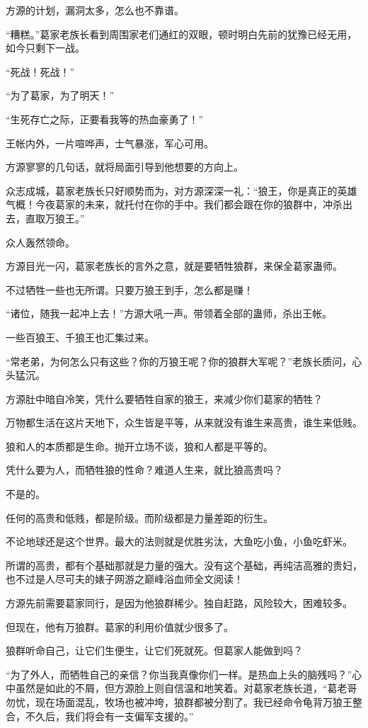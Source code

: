 \begin{this_body}
方源的计划，漏洞太多，怎么也不靠谱。

“糟糕。”葛家老族长看到周围家老们通红的双眼，顿时明白先前的犹豫已经无用，如今只剩下一战。

“死战！死战！”

“为了葛家，为了明天！”

“生死存亡之际，正要看我等的热血豪勇了！”

王帐内外，一片喧哗声，士气暴涨，军心可用。

方源寥寥的几句话，就将局面引导到他想要的方向上。

众志成城，葛家老族长只好顺势而为，对方源深深一礼：“狼王，你是真正的英雄气概！今夜葛家的未来，就托付在你的手中。我们都会跟在你的狼群中，冲杀出去，直取万狼王。”

众人轰然领命。

方源目光一闪，葛家老族长的言外之意，就是要牺牲狼群，来保全葛家蛊师。

不过牺牲一些也无所谓。只要万狼王到手，怎么都是赚！

“诸位，随我一起冲上去！”方源大吼一声。带领着全部的蛊师，杀出王帐。

一些百狼王、千狼王也汇集过来。

“常老弟，为何怎么只有这些？你的万狼王呢？你的狼群大军呢？”老族长质问，心头猛沉。

方源肚中暗自冷笑，凭什么要牺牲自家的狼王，来减少你们葛家的牺牲？

万物都生活在这片天地下，众生皆是平等，从来就没有谁生来高贵，谁生来低贱。

狼和人的本质都是生命。抛开立场不谈，狼和人都是平等的。

凭什么要为人，而牺牲狼的性命？难道人生来，就比狼高贵吗？

不是的。

任何的高贵和低贱，都是阶级。而阶级都是力量差距的衍生。

不论地球还是这个世界。最大的法则就是优胜劣汰，大鱼吃小鱼，小鱼吃虾米。

所谓的高贵，都有个基础那就是力量的强大。没有这个基础，再纯洁高雅的贵妇，也不过是人尽可夫的婊子网游之巅峰浴血师全文阅读！

方源先前需要葛家同行，是因为他狼群稀少。独自赶路，风险较大，困难较多。

但现在，他有万狼群。葛家的利用价值就少很多了。

狼群听命自己，让它们生便生，让它们死就死。但葛家人能做到吗？

“为了外人，而牺牲自己的亲信？你当我真像你们一样。是热血上头的脑残吗？”心中虽然是如此的不屑，但方源脸上则自信温和地笑着。对葛家老族长道，“葛老哥勿忧，现在场面混乱，牧场也被冲垮，狼群都被分割了。我已经命令龟背万狼王整合，不久后，我们将会有一支偏军支援的。”


\end{this_body}
